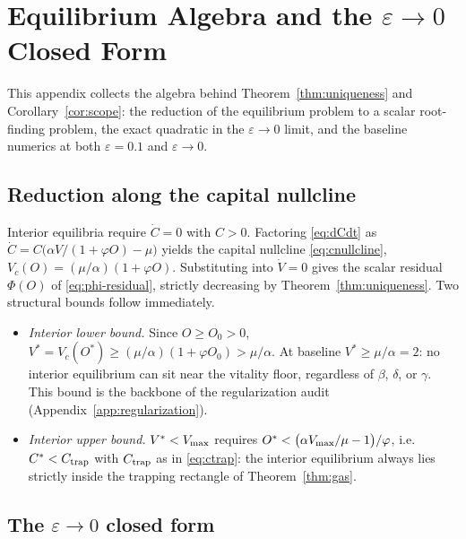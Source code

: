 \section{Equilibrium Algebra and the $\varepsilon\to0$ Closed Form}
\label{app:equilibrium}

This appendix collects the algebra behind Theorem~\ref{thm:uniqueness} and
Corollary~\ref{cor:scope}: the reduction of the equilibrium problem to a
scalar root-finding problem, the exact quadratic in the
$\varepsilon\to0$ limit, and the baseline numerics at both $\varepsilon=0.1$
and $\varepsilon\to0$.

\subsection{Reduction along the capital nullcline}

Interior equilibria require $\dot C=0$ with $C>0$. Factoring
\eqref{eq:dCdt} as $\dot C=C\bigl(\alpha V/(1+\varphi O)-\mu\bigr)$ yields
the capital nullcline \eqref{eq:cnullcline},
$V_c(O)=(\mu/\alpha)(1+\varphi O)$. Substituting into $\dot V=0$ gives the
scalar residual $\Phi(O)$ of \eqref{eq:phi-residual}, strictly decreasing by
Theorem~\ref{thm:uniqueness}. Two structural bounds follow immediately.

\begin{itemize}
\item \emph{Interior lower bound.} Since $O\ge O_0>0$,
$V^{*}=V_c(O^{*})\ge(\mu/\alpha)(1+\varphi O_0)>\mu/\alpha$. At baseline
$V^{*}\ge\mu/\alpha=2$: no interior equilibrium can sit near the vitality
floor, regardless of $\beta$, $\delta$, or $\gamma$. This bound is the
backbone of the regularization audit (Appendix~\ref{app:regularization}).
\item \emph{Interior upper bound.} $V^{*}<V_{\max}$ requires
$O^{*}<\bigl(\alpha V_{\max}/\mu-1\bigr)/\varphi$, i.e.\ $C^{*}<C_{\mathrm{trap}}$ with
$C_{\mathrm{trap}}$ as in \eqref{eq:ctrap}: the interior equilibrium always lies
strictly inside the trapping rectangle of Theorem~\ref{thm:gas}.
\end{itemize}

\subsection{The $\varepsilon\to0$ closed form}

